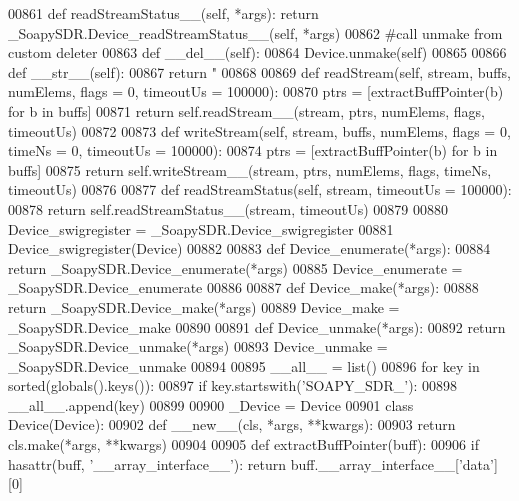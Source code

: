 \begin{DoxyCode}
{{{{{00861     \textcolor{keyword}{def }readStreamStatus__(self, *args): \textcolor{keywordflow}{return} \_SoapySDR.Device\_readStreamStatus\_\_(self, *args)
00862     \textcolor{comment}{#call unmake from custom deleter}
00863     \textcolor{keyword}{def }__del__(self):
00864         Device.unmake(self)
00865 
00866     \textcolor{keyword}{def }__str__(self):
00867         \textcolor{keywordflow}{return} \textcolor{stringliteral}{"%
00868 
00869     \textcolor{keyword}{def }readStream(self, stream, buffs, numElems, flags = 0, timeoutUs = 100000):
00870         ptrs = [extractBuffPointer(b) \textcolor{keywordflow}{for} b \textcolor{keywordflow}{in} buffs]
00871         \textcolor{keywordflow}{return} self.readStream__(stream, ptrs, numElems, flags, timeoutUs)
00872 
00873     \textcolor{keyword}{def }writeStream(self, stream, buffs, numElems, flags = 0, timeNs = 0, timeoutUs = 100000):
00874         ptrs = [extractBuffPointer(b) \textcolor{keywordflow}{for} b \textcolor{keywordflow}{in} buffs]
00875         \textcolor{keywordflow}{return} self.writeStream__(stream, ptrs, numElems, flags, timeNs, timeoutUs)
00876 
00877     \textcolor{keyword}{def }readStreamStatus(self, stream, timeoutUs = 100000):
00878         \textcolor{keywordflow}{return} self.readStreamStatus__(stream, timeoutUs)
00879 
00880 Device\_swigregister = \_SoapySDR.Device\_swigregister
00881 Device_swigregister(Device)
00882 
00883 \textcolor{keyword}{def }Device_enumerate(*args):
00884   \textcolor{keywordflow}{return} \_SoapySDR.Device\_enumerate(*args)
00885 Device\_enumerate = \_SoapySDR.Device\_enumerate
00886 
00887 \textcolor{keyword}{def }Device_make(*args):
00888   \textcolor{keywordflow}{return} \_SoapySDR.Device\_make(*args)
00889 Device\_make = \_SoapySDR.Device\_make
00890 
00891 \textcolor{keyword}{def }Device_unmake(*args):
00892   \textcolor{keywordflow}{return} \_SoapySDR.Device\_unmake(*args)
00893 Device\_unmake = \_SoapySDR.Device\_unmake
00894 
00895 \_\_all\_\_ = list()
00896 \textcolor{keywordflow}{for} key \textcolor{keywordflow}{in} sorted(globals().keys()):
00897     \textcolor{keywordflow}{if} key.startswith(\textcolor{stringliteral}{'SOAPY\_SDR\_'}):
00898         \_\_all\_\_.append(key)
00899 
00900 \_Device = Device
00901 \textcolor{keyword}{class }Device(Device):
00902     \textcolor{keyword}{def }__new__(cls, *args, **kwargs):
00903         \textcolor{keywordflow}{return} cls.make(*args, **kwargs)
00904 
00905 \textcolor{keyword}{def }extractBuffPointer(buff):
00906     \textcolor{keywordflow}{if} hasattr(buff, \textcolor{stringliteral}{'\_\_array\_interface\_\_'}): \textcolor{keywordflow}{return} buff.\_\_array\_interface\_\_[\textcolor{stringliteral}{'data'}][0]
}}}}}}
\end{DoxyCode}
